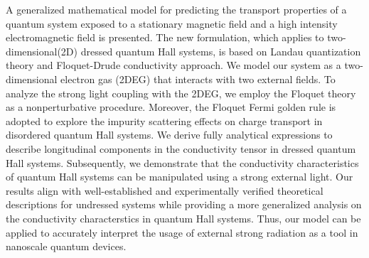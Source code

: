 A generalized mathematical model for predicting the transport properties of a quantum system exposed to a stationary magnetic field and a high intensity electromagnetic field is presented.
The new formulation, which applies to two-dimensional(2D) dressed quantum Hall systems, is based on Landau quantization theory and Floquet-Drude conductivity approach.
We model our system as a two-dimensional electron gas (2DEG) that interacts with two external fields. To analyze the strong light coupling with the 2DEG, we employ the Floquet theory as a nonperturbative procedure.
Moreover, the Floquet Fermi golden rule is adopted to explore the impurity scattering effects on charge transport in disordered quantum Hall systems.
We derive fully analytical expressions to describe longitudinal components in the conductivity tensor in dressed quantum Hall systems. Subsequently, we demonstrate that the conductivity characteristics of quantum Hall systems can be manipulated using a strong external light.
Our results align with well-established and experimentally
verified theoretical descriptions for undressed systems while providing a more generalized analysis on the conductivity characterstics in quantum Hall systems.
Thus, our model can be applied to accurately interpret the usage of external strong radiation as a tool in nanoscale quantum devices.
